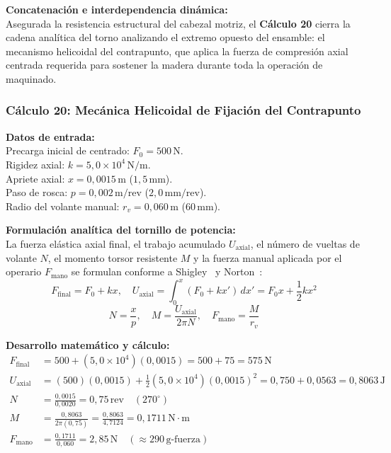 \documentclass[12pt,a4paper]{article}
\begin{document}
\noindent\textbf{Concatenación e interdependencia dinámica:}\\
Asegurada la resistencia estructural del cabezal motriz, el \textbf{Cálculo 20} cierra la cadena analítica del torno analizando el extremo opuesto del ensamble: el mecanismo helicoidal del contrapunto, que aplica la fuerza de compresión axial centrada requerida para sostener la madera durante toda la operación de maquinado.
\vspace{12pt}

\subsubsection{Cálculo 20: Mecánica Helicoidal de Fijación del Contrapunto}

\noindent\textbf{Datos de entrada:}\\
Precarga inicial de centrado: $F_0 = 500\,\text{N}$.\\
Rigidez axial: $k = 5{,}0\times 10^4\,\text{N/m}$.\\
Apriete axial: $x = 0{,}0015\,\text{m}$ ($1{,}5\,\text{mm}$).\\
Paso de rosca: $p = 0{,}002\,\text{m/rev}$ ($2{,}0\,\text{mm/rev}$).\\
Radio del volante manual: $r_v = 0{,}060\,\text{m}$ ($60\,\text{mm}$).
\vspace{6pt}

\noindent\textbf{Formulación analítica del tornillo de potencia:}\\
La fuerza elástica axial final, el trabajo acumulado $U_{\text{axial}}$, el número de vueltas de volante $N$, el momento torsor resistente $M$ y la fuerza manual aplicada por el operario $F_{\text{mano}}$ se formulan conforme a Shigley~\cite{shigley2015} y Norton~\cite{norton2013}:
\begin{equation}
    F_{\text{final}} = F_0 + k x, \quad U_{\text{axial}} = \int_0^x (F_0 + k x')\,dx' = F_0 x + \frac{1}{2} k x^2
\end{equation}
\begin{equation}
    N = \frac{x}{p}, \quad M = \frac{U_{\text{axial}}}{2\pi N}, \quad F_{\text{mano}} = \frac{M}{r_v}
\end{equation}
\vspace{6pt}

\noindent\textbf{Desarrollo matemático y cálculo:}
\begin{align}
    F_{\text{final}} &= 500 + (5{,}0\times 10^4)(0{,}0015) = 500 + 75 = \boxed{575\,\text{N}} \\[6pt]
    U_{\text{axial}} &= (500)(0{,}0015) + \frac{1}{2}(5{,}0 \times 10^4)(0{,}0015)^2 = 0{,}750 + 0{,}0563 = \boxed{0{,}8063\,\text{J}} \\[6pt]
    N &= \frac{0{,}0015}{0{,}0020} = \boxed{0{,}75\,\text{rev}} \quad (270^\circ) \\[6pt]
    M &= \frac{0{,}8063}{2\pi(0{,}75)} = \frac{0{,}8063}{4{,}7124} = \boxed{0{,}1711\,\text{N}\cdot\text{m}} \\[6pt]
    F_{\text{mano}} &= \frac{0{,}1711}{0{,}060} = \boxed{2{,}85\,\text{N}} \quad (\approx 290\,\text{g-fuerza})
\end{align}
\vspace{6pt}
\end{document}
